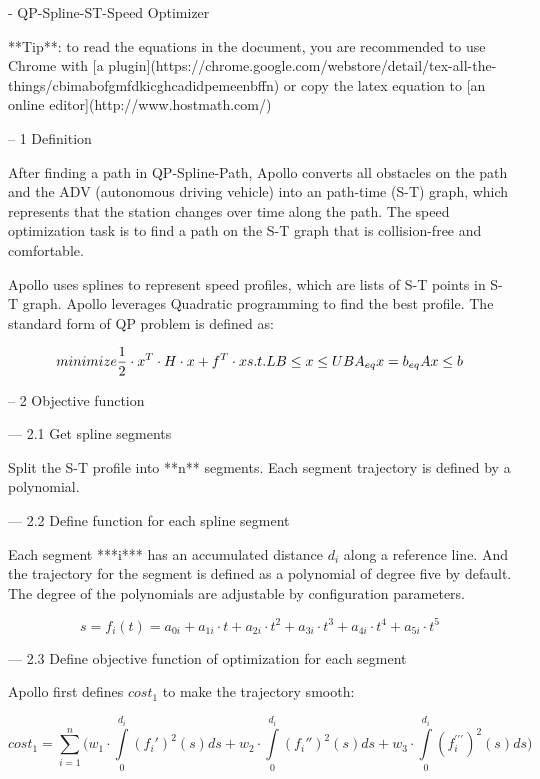 \documentclass[a4paper,11pt]{article}  %
\begin{document}
- QP-Spline-ST-Speed Optimizer

**Tip**: to read the equations in the document, you are recommended to use Chrome with [a plugin](https://chrome.google.com/webstore/detail/tex-all-the-things/cbimabofgmfdkicghcadidpemeenbffn) or copy the latex equation to [an online editor](http://www.hostmath.com/)

-- 1  Definition 

After finding a path in QP-Spline-Path, Apollo converts all obstacles on the path and the ADV (autonomous driving vehicle) into an path-time (S-T) graph, which represents that the station changes over time along the path. The speed optimization task is to find a path on the S-T graph that is collision-free and comfortable. 

Apollo uses splines to represent speed profiles, which are lists of S-T points in S-T graph. Apollo leverages Quadratic programming to find the best profile. The standard form of QP problem is defined as: 

$$
minimize \frac{1}{2} \cdot x^T \cdot H \cdot x + f^T \cdot x 
\\
s.t. LB \leq x \leq UB
\\
A_{eq}x = b_{eq}
\\
Ax \leq b
$$


-- 2  Objective function

--- 2.1  Get spline segments

Split the S-T profile into **n** segments. Each segment trajectory is defined by a polynomial.

--- 2.2  Define function for each spline segment

Each segment ***i*** has an accumulated distance $d_i$ along a reference line. And the trajectory for the segment is defined as a polynomial of degree five by default. The degree of the polynomials are adjustable by configuration parameters.


$$
s = f_i(t) 
  = a_{0i} + a_{1i} \cdot t + a_{2i} \cdot t^2 + a_{3i} \cdot t^3 + a_{4i} \cdot t^4 + a_{5i} \cdot t^5
$$


--- 2.3  Define  objective function of optimization for each segment

Apollo first defines $cost_1$ to make the trajectory smooth: 

$$
cost_1 = \sum_{i=1}^{n} \Big( w_1 \cdot \int\limits_{0}^{d_i} (f_i')^2(s) ds + w_2 \cdot \int\limits_{0}^{d_i} (f_i'')^2(s) ds + w_3 \cdot \int\limits_{0}^{d_i} (f_i^{\prime\prime\prime})^2(s) ds \Big)
$$
\end{document}
